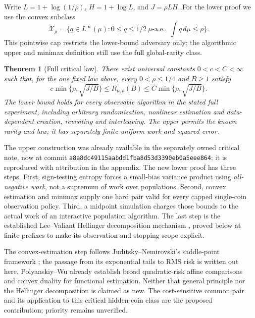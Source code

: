 \documentclass[11pt]{article}
\newtheorem{theorem}{Theorem}
\newcommand{\Xrho}{\mathcal X_\rho}
\begin{document}
Write $L=1+\log(1/\rho)$, $H=1+\log L$, and $J=\rho LH$.
For the lower proof we use the convex subclass
\[
 \Xrho=\{q\in L^\infty(\mu):0\le q\le1/2\ \mu\text{-a.e.},\ \int q\,d\mu\le\rho\}.
\]
This pointwise cap restricts the lower-bound adversary only; the algorithmic
upper and minimax definition still use the full global-rarity class.

\begin{theorem}[Full critical law]\label{thm:critical-minimax}
There exist universal constants $0<c<C<\infty$ such that, for the one fixed
law above, every $0<\rho\le1/4$ and $B\ge1$ satisfy
\[
 c\min\{\rho,\sqrt{J/B}\}\le R_{\mu,\rho}(B)
       \le C\min\{\rho,\sqrt{J/B}\}.                    \tag{A}
\]
The lower bound holds for every observable algorithm in the stated full
experiment, including arbitrary randomization, nonlinear estimation and
data-dependent creation, revisiting and interleaving. The upper permits the
known rarity and law; it has separately finite uniform work and squared error.
\end{theorem}

The upper construction was already available in the separately owned critical
note, now at commit \texttt{a8a8dc49115aabdd1fba8d53d3390eb0a5eee864}; it is
reproduced with attribution in the appendix. The new lower proof has three
steps. First, sign-testing entropy forces a small-bias variance product using
\emph{all-negative work}, not a supremum of work over populations. Second,
convex estimation and minimax supply one hard pair valid for every capped
single-coin observation policy. Third, a midpoint simulation charges those
bounds to the actual work of an interactive population algorithm. The last
step is the established Lee--Valiant Hellinger decomposition mechanism
\cite[Lemma 17]{lv}, proved below at finite prefixes to make its observation
and stopping scope explicit.

The convex-estimation step follows Juditsky--Nemirovski's saddle-point
framework \cite{jn}; the passage from its exponential tails to RMS risk is
written out here. Polyanskiy--Wu \cite{pw} already establish broad quadratic-risk
affine comparisons and convex duality for functional estimation. Neither that
general principle nor the Hellinger decomposition is claimed as new. The
cost-sensitive common pair and its application to this critical hidden-coin
class are the proposed contribution; priority remains unverified.



\end{document}
